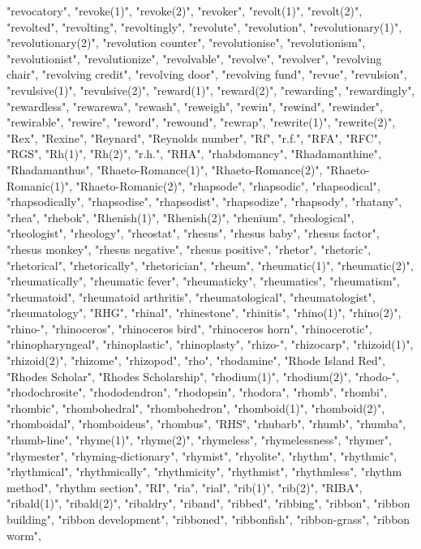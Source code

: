 "revocatory",
"revoke(1)",
"revoke(2)",
"revoker",
"revolt(1)",
"revolt(2)",
"revolted",
"revolting",
"revoltingly",
"revolute",
"revolution",
"revolutionary(1)",
"revolutionary(2)",
"revolution counter",
"revolutionise",
"revolutionism",
"revolutionist",
"revolutionize",
"revolvable",
"revolve",
"revolver",
"revolving chair",
"revolving credit",
"revolving door",
"revolving fund",
"revue",
"revulsion",
"revulsive(1)",
"revulsive(2)",
"reward(1)",
"reward(2)",
"rewarding",
"rewardingly",
"rewardless",
"rewarewa",
"rewash",
"reweigh",
"rewin",
"rewind",
"rewinder",
"rewirable",
"rewire",
"reword",
"rewound",
"rewrap",
"rewrite(1)",
"rewrite(2)",
"Rex",
"Rexine",
"Reynard",
"Reynolds number",
"Rf",
"r.f.",
"RFA",
"RFC",
"RGS",
"Rh(1)",
"Rh(2)",
"r.h.",
"RHA",
"rhabdomancy",
"Rhadamanthine",
"Rhadamanthus",
"Rhaeto-Romance(1)",
"Rhaeto-Romance(2)",
"Rhaeto-Romanic(1)",
"Rhaeto-Romanic(2)",
"rhapsode",
"rhapsodic",
"rhapsodical",
"rhapsodically",
"rhapsodise",
"rhapsodist",
"rhapsodize",
"rhapsody",
"rhatany",
"rhea",
"rhebok",
"Rhenish(1)",
"Rhenish(2)",
"rhenium",
"rheological",
"rheologist",
"rheology",
"rheostat",
"rhesus",
"rhesus baby",
"rhesus factor",
"rhesus monkey",
"rhesus negative",
"rhesus positive",
"rhetor",
"rhetoric",
"rhetorical",
"rhetorically",
"rhetorician",
"rheum",
"rheumatic(1)",
"rheumatic(2)",
"rheumatically",
"rheumatic fever",
"rheumaticky",
"rheumatics",
"rheumatism",
"rheumatoid",
"rheumatoid arthritis",
"rheumatological",
"rheumatologist",
"rheumatology",
"RHG",
"rhinal",
"rhinestone",
"rhinitis",
"rhino(1)",
"rhino(2)",
"rhino-",
"rhinoceros",
"rhinoceros bird",
"rhinoceros horn",
"rhinocerotic",
"rhinopharyngeal",
"rhinoplastic",
"rhinoplasty",
"rhizo-",
"rhizocarp",
"rhizoid(1)",
"rhizoid(2)",
"rhizome",
"rhizopod",
"rho",
"rhodamine",
"Rhode Island Red",
"Rhodes Scholar",
"Rhodes Scholarship",
"rhodium(1)",
"rhodium(2)",
"rhodo-",
"rhodochrosite",
"rhododendron",
"rhodopsin",
"rhodora",
"rhomb",
"rhombi",
"rhombic",
"rhombohedral",
"rhombohedron",
"rhomboid(1)",
"rhomboid(2)",
"rhomboidal",
"rhomboideus",
"rhombus",
"RHS",
"rhubarb",
"rhumb",
"rhumba",
"rhumb-line",
"rhyme(1)",
"rhyme(2)",
"rhymeless",
"rhymelessness",
"rhymer",
"rhymester",
"rhyming-dictionary",
"rhymist",
"rhyolite",
"rhythm",
"rhythmic",
"rhythmical",
"rhythmically",
"rhythmicity",
"rhythmist",
"rhythmless",
"rhythm method",
"rhythm section",
"RI",
"ria",
"rial",
"rib(1)",
"rib(2)",
"RIBA",
"ribald(1)",
"ribald(2)",
"ribaldry",
"riband",
"ribbed",
"ribbing",
"ribbon",
"ribbon building",
"ribbon development",
"ribboned",
"ribbonfish",
"ribbon-grass",
"ribbon worm",
